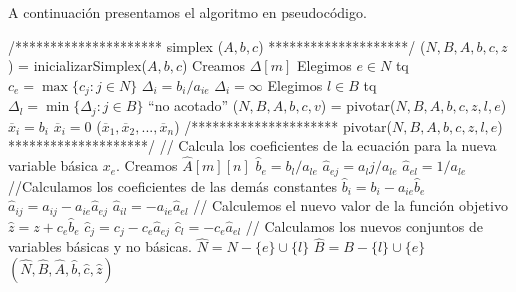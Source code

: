 A continuación presentamos el algoritmo en pseudocódigo.

\begin{algorithmic}[1]
\State /*********************
\State	* simplex ($A,b,c$)
\State *********************/
\State ($N,B,A,b,c,z$) = inicializarSimplex($A,b,c$)
\State Creamos $\Delta[m]$
    \State Elegimos $e\in N$ tq $c_e=\max\{c_j:j\in N\}$
    		\State$\Delta_i=b_i/a_{ie}$
    	\Else
	    	\State $\Delta_i=\infty$
    	\EndIf	
    \State Elegimos $l\in B$ tq $\Delta_l=\min\{\Delta_j:j\in B\}$
    	\State\Return ``no acotado''
    \Else
    	\State ($N,B,A,b,c,v$) = pivotar($N,B,A,b,c,z,l,e$)
    \EndIf
    \EndFor
\EndWhile
{}
		\State $\overline{x}_i = b_i$
	\Else
		\State $\overline{x}_i = 0$
	\EndIf
\EndFor	
\State\Return ($\overline{x}_1,\overline{x}_2,...,\overline{x}_n$)
\State
\State
\State
\State
\State /*********************
\State	* pivotar($N,B,A,b,c,z,l,e$)
\State *********************/
\State// Calcula los coeficientes de la ecuación para la nueva variable básica $x_e$.
\State Creamos $\hat{A}[m][n]$
\State $\hat{b}_e=b_l/a_{le}$
	\State $\hat{a}_{ej}=a_lj/a_{le}$
\EndFor
\State $\hat{a}_{el}=1/a_{le}$
\State //Calculamos los coeficientes de las demás constantes
	\State $\hat{b}_i=b_i-a_{ie}\hat{b}_e$
		\State $\hat{a}_{ij}=a_{ij}-a_{ie}\hat{a}_{ej}$
	\EndFor
	\State $\hat{a}_{il}=-a_{ie}\hat{a}_{el}$
\EndFor
\State // Calculemos el nuevo valor de la función objetivo
\State $\hat{z}=z+c_e\hat{b}_e$
	\State $\hat{c}_j=c_j-c_e\hat{a}_{ej}$
\EndFor
\State $\hat{c}_l=-c_e\hat{a}_{el}$
\State // Calculamos los nuevos conjuntos de variables básicas y no básicas.
\State $\hat{N}=N-\{e\}\cup\{l\}$
\State $\hat{B}=B-\{l\}\cup\{e\}$
\State \Return $(\hat{N},\hat{B},\hat{A},\hat{b},\hat{c},\hat{z})$
\end{algorithmic}

